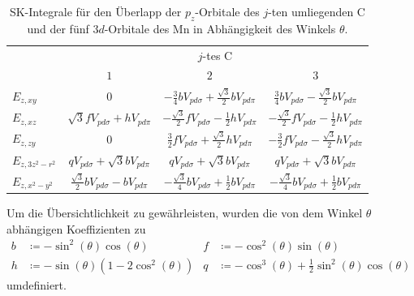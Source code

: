 \begin{table}
    \centering
    \caption{SK-Integrale für den Überlapp der $p_z$-Orbitale des $j$-ten umliegenden
    C und der fünf $3d$-Orbitale des Mn in Abhängigkeit des Winkels $\theta$.}
    \label{tab:slaterkosters}
    \begin{tabular}{l c c c}
    & \multicolumn{3}{c}{$j$-tes C}\\
    \cmidrule(lr){2-4}
    & {$1$} & {$2$} & {$3$} \\
    \midrule
    {$E_{z,xy}$      }  & {$0$}                                               & {$-\frac{3}{4}bV_{pd\sigma} + \frac{\sqrt{3}}{2}bV_{pd\pi}$}          & {$ \frac{3}{4}bV_{pd\sigma}-\frac{\sqrt{3}}{2}bV_{pd\pi}$}         \vspace{0.5cm} \\ 
    {$E_{z,xz}$      }  & {$\sqrt{3}fV_{pd\sigma} + hV_{pd\pi}$}              & {$-\frac{\sqrt{3}}{2}fV_{pd\sigma} - \frac{1}{2} hV_{pd\pi}$}         & {$-\frac{\sqrt{3}}{2}fV_{pd\sigma} - \frac{1}{2} hV_{pd\pi}$}      \vspace{0.5cm} \\
    {$E_{z,zy}$      }  & {$0$}                                               & {$ \frac{3}{2}fV_{pd\sigma}+\frac{\sqrt{3}}{2} hV_{pd\pi}$}           & {$-\frac{3}{2}fV_{pd\sigma}-\frac{\sqrt{3}}{2} hV_{pd\pi}$}        \vspace{0.5cm} \\
    {$E_{z,3z^2-r^2}$}  & {$q V_{pd\sigma}+\sqrt{3}bV_{pd\pi}$}               & {$q V_{pd\sigma}+\sqrt{3}bV_{pd\pi}$}                                 & {$q V_{pd\sigma}+\sqrt{3}bV_{pd\pi}$} \vspace{0.5cm} \\
    {$E_{z,x^2-y^2}$ }  & {$\frac{\sqrt{3}}{2}bV_{pd\sigma}-bV_{pd\pi}$}      & {$-\frac{\sqrt{3}}{4}bV_{pd\sigma}+\frac{1}{2}bV_{pd\pi}$}           & {$-\frac{\sqrt{3}}{4}bV_{pd\sigma}+\frac{1}{2}bV_{pd\pi}$}                       \\ 
    \bottomrule
    \end{tabular}
  \end{table}
Um die Übersichtlichkeit zu gewährleisten, wurden die von dem Winkel $\theta$ abhängigen Koeffizienten zu
\begin{equation}
    \begin{aligned}
b & \coloneq -\sin^2(\theta) \cos(\theta)        & f &  \coloneq -\cos^2(\theta) \sin(\theta)                             \\                     
h & \coloneq -\sin(\theta)(1-2\cos^2(\theta))    & q &  \coloneq -\cos^3(\theta) + \frac{1}{2}\sin^2(\theta) \cos(\theta)
    \end{aligned} \label{eqn:Vorfaktoren}
\end{equation}
umdefiniert.
